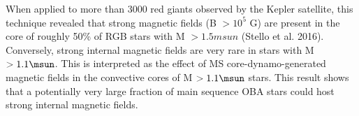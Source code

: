 When applied to more than 3000 red giants observed by the Kepler satellite, this technique revealed that
strong magnetic fields (B $> 10^5$ G) are present in the core of roughly 50\% of RGB stars with M $> 1.5msun$ (Stello et al. 2016).
Conversely, strong internal magnetic fields are very rare in stars with M $> 1.1\msun$. This is interpreted as the
effect of MS core-dynamo-generated magnetic fields in the convective cores of M $> 1.1\msun$ stars.
This result shows that a potentially very large fraction of main sequence OBA stars could host strong internal magnetic fields.



